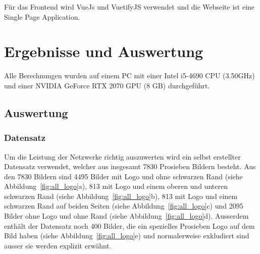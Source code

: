 \documentclass[12pt,a4paper]{report}
\begin{document}
Für das Frontend wird VueJs\cite{vuejs} und VuetifyJS\cite{vuetify} verwendet und die Webseite ist eine Single Page Application.

\chapter{Ergebnisse und Auswertung}\label{ch:ergebnisseUndAuswertung}
Alle Berechnungen wurden auf einem PC mit einer Intel i5-4690 CPU (3.50GHz) und einer NVIDIA GeForce RTX 2070 GPU (8 GB) durchgeführt.
\section{Auswertung}
\subsection{Datensatz}\label{subsec:datensatz}
Um die Leistung der Netzwerke richtig auszuwerten wird ein selbst erstellter Datensatz verwendet,
welcher aus insgesamt 7830 Prosieben Bildern besteht.
Aus den 7830 Bildern sind 4495 Bilder mit Logo und ohne schwarzen Rand (siehe Abbildung~\ref{fig:all_logo}a),
813 mit Logo und einem oberen und unteren schwarzen Rand (siehe Abbildung~\ref{fig:all_logo}b),
813 mit Logo und einem schwarzen Rand auf beiden Seiten (siehe Abbildung~\ref{fig:all_logo}c)
und 2095 Bilder ohne Logo und ohne Rand (siehe Abbildung~\ref{fig:all_logo}d).
Ausserdem enthält der Datensatz noch 400 Bilder, die ein spezielles Prosieben Logo auf dem Bild haben (siehe Abbildung~\ref{fig:all_logo}e)
und normalerweise exkludiert sind ausser sie werden explizit erwähnt.
\end{document}
